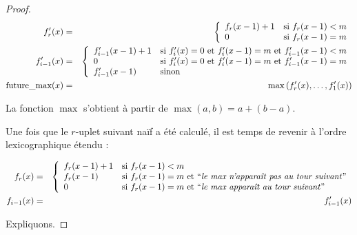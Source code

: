 \begin{proof}
			\begin{eqnarray}
				f'_{r}(x) & = &\left\lbrace \begin{array}{ll} 
									f_r(x-1)+1 & \text{si $f_r(x-1) < m$} \\
									0 & \text{si $f_r(x-1) = m$}
								 \end{array} \right.\\
				f'_{i-1}(x) & = & \left\lbrace \begin{array}{ll} 
									f'_{i-1}(x-1)+1 & \text{si $f'_{i}(x) = 0$ et $f'_{i}(x-1) = m$ et $f'_{i-1}(x-1) < m$} \\
									0 & \text{si $f'_{i}(x) = 0$ et $f'_{i}(x-1) = m$ et $f'_{i-1}(x-1) = m$} \\
									f'_{i-1}(x-1) & \text{sinon}
								 \end{array} \right. \\
				\text{future\_max}(x) & = & \max\left(f'_{r}(x), \dots, f'_{1}(x)\right)
			\end{eqnarray}
			
			La fonction $\max$ s'obtient à partir de $\max\left(a, b\right) = a + (b-a)$. 
						
			Une fois que le $r$-uplet suivant naïf a été calculé, il est temps de revenir à l'ordre lexicographique étendu :
			
			\begin{eqnarray}
				f_{r}(x) & = & \casedist{
									f_{r}(x-1) + 1 & \text{si $f_{r}(x-1) < m$} \\
									f_{r}(x-1) & \text{si $f_{r}(x-1) = m$ et \textquoted{\emph{le max n'apparaît pas au tour suivant}}}\\
									0 & \text{si $f_{r}(x-1) = m$ et \textquoted{\emph{le max apparaît au tour suivant}}}
									}\\
				f_{i-1}(x) & = & f'_{i-1}(x)
			\end{eqnarray}
			
			Expliquons. 
			

\end{proof}
